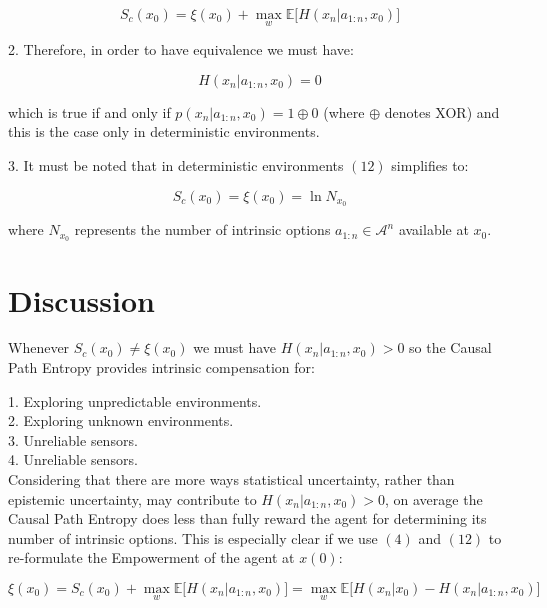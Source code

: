 \documentclass{article}
\begin{document}
\begin{equation}
S_c(x_0) = \xi(x_0)  + \max\limits_{w} \mathbb{E} \big[H(x_n|a_{1:n},x_0)\big]
\end{equation}

2. Therefore, in order to have equivalence we must have:

\begin{equation}
H(x_n|a_{1:n},x_0) = 0
\end{equation}

which is true if and only if $p(x_n|a_{1:n},x_0) = 1 \oplus 0$ (where $\oplus$ denotes XOR) and this is the case only in deterministic environments. 

3. It must be noted that in deterministic environments $(12)$ simplifies to:

\begin{equation}
S_c(x_0) = \xi(x_0)  = \ln N_{x_0}
\end{equation}

where $N_{x_0}$ represents the number of intrinsic options $a_{1:n} \in \mathcal{A}^n$ available at $x_0$. 

\section{Discussion}

Whenever $S_c(x_0) \neq \xi(x_0)$ we must have $H(x_n|a_{1:n},x_0) > 0$ so the Causal Path Entropy provides intrinsic compensation for:

1. Exploring unpredictable environments. \\
2. Exploring unknown environments. \\
3. Unreliable sensors. \\
4. Unreliable sensors. \\

Considering that there are more ways statistical uncertainty, rather than epistemic uncertainty, may contribute to $H(x_n|a_{1:n},x_0) > 0$, on average the Causal Path Entropy does less than fully reward the agent for determining its number of intrinsic options. This is especially clear if we use $(4)$ and $(12)$ to re-formulate the Empowerment of the agent at $x(0)$:

\begin{equation}
\xi(x_0) = S_c(x_0)  + \max\limits_{w} \mathbb{E} \big[H(x_n|a_{1:n},x_0)\big] =  \max\limits_{w} \mathbb{E} \big[H(x_n|x_0) -H(x_n|a_{1:n},x_0)\big]
\end{equation}
\end{document}
